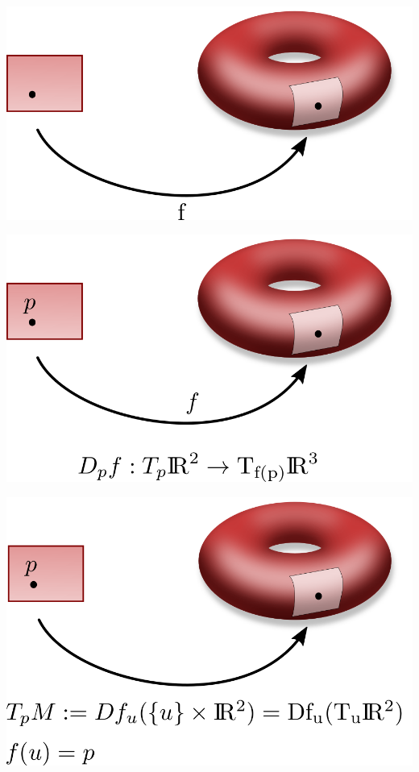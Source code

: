 \documentclass[spanish]{beamer}
\begin{document}
\begin{frame}
    \includegraphics[width=\textwidth]{../gfx/toro-1}
\end{frame}
\begin{frame}
    \includegraphics[width=\textwidth]{../gfx/toro-2}
\end{frame}
\begin{frame}
    \includegraphics[width=\textwidth]{../gfx/toro-3}
\end{frame}
\end{document}
